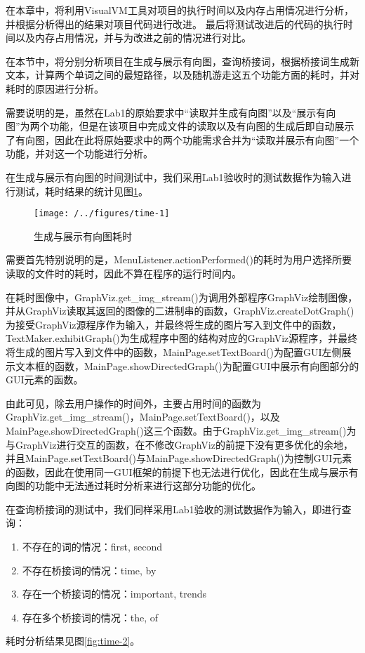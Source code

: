在本章中，将利用VisualVM工具对项目的执行时间以及内存占用情况进行分析，并根据分析得出的结果对项目代码进行改进。
最后将测试改进后的代码的执行时间以及内存占用情况，并与为改进之前的情况进行对比。

在本节中，将分别分析项目在生成与展示有向图，查询桥接词，根据桥接词生成新文本，计算两个单词之间的最短路径，以及随机游走这五个功能方面的耗时，并对耗时的原因进行分析。

需要说明的是，虽然在Lab1的原始要求中“读取并生成有向图”以及“展示有向图”为两个功能，但是在该项目中完成文件的读取以及有向图的生成后即自动展示了有向图，因此在此将原始要求中的两个功能需求合并为“读取并展示有向图”一个功能，并对这一个功能进行分析。

在生成与展示有向图的时间测试中，我们采用Lab1验收时的测试数据作为输入进行测试，耗时结果的统计见图\ref{fig:time-1}。

\begin{figure}
\centering
\texttt{[image: /../figures/time-1]}
\caption{生成与展示有向图耗时}
\label{fig:time-1}
\end{figure}

需要首先特别说明的是，MenuListener.actionPerformed()的耗时为用户选择所要读取的文件时的耗时，因此不算在程序的运行时间内。

在耗时图像中，GraphViz.get\_img\_stream()为调用外部程序GraphViz绘制图像，并从GraphViz读取其返回的图像的二进制串的函数，GraphViz.createDotGraph()为接受GraphViz源程序作为输入，并最终将生成的图片写入到文件中的函数，TextMaker.exhibitGraph()为生成程序中图的结构对应的GraphViz源程序，并最终将生成的图片写入到文件中的函数，MainPage.setTextBoard()为配置GUI左侧展示文本框的函数，MainPage.showDirectedGraph()为配置GUI中展示有向图部分的GUI元素的函数。

由此可见，除去用户操作的时间外，主要占用时间的函数为GraphViz.get\_img\_stream()，MainPage.setTextBoard()，以及MainPage.showDirectedGraph()这三个函数。由于GraphViz.get\_img\_stream()为与GraphViz进行交互的函数，在不修改GraphViz的前提下没有更多优化的余地，并且MainPage.setTextBoard()与MainPage.showDirectedGraph()为控制GUI元素的函数，因此在使用同一GUI框架的前提下也无法进行优化，因此在生成与展示有向图的功能中无法通过耗时分析来进行这部分功能的优化。

在查询桥接词的测试中，我们同样采用Lab1验收的测试数据作为输入，即进行查询：
\begin{enumerate}
  \item 不存在的词的情况：first, second
  \item 不存在桥接词的情况：time, by
  \item 存在一个桥接词的情况：important, trends
  \item 存在多个桥接词的情况：the, of
\end{enumerate}
耗时分析结果见图\ref{fig:time-2}。

